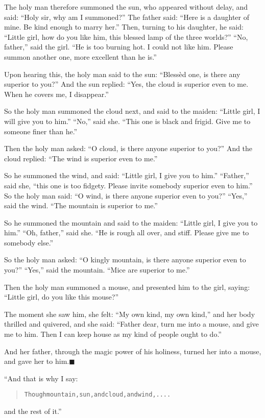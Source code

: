 \documentclass[article, twoside, 14pt]{memoir}
\newcommand{\qed}{\hfill \ensuremath{\blacksquare}}
\renewenvironment{verbatim}{%
\begin{quote}%
\vskip -10pt%
\begin{alltt}\normalfont\large}{\end{alltt}%
\end{quote}%
\vskip -10pt
} %
\begin{document}
The holy man therefore summoned the sun, who appeared without
delay, and said: ``Holy sir, why am I summoned?'' The father said:
``Here is a daughter of mine. Be kind enough to marry her.''
Then, turning to his daughter, he said:
``Little girl, how do you like him, this blessed lamp of the three worlds?''
``No, father,'' said the girl.
``He is too burning hot. I could not like him. Please summon another one, more excellent than he is.''

Upon hearing this, the holy man said to the sun:
``Blessèd one, is there any superior to you?'' And the sun replied:
``Yes, the cloud is superior even to me. When he covers me, I disappear.''

So the holy man summoned the cloud next, and said to the maiden:
``Little girl, I will give you to him.'' ``No,'' said she.
``This one is black and frigid. Give me to someone finer than he.''

Then the holy man asked:
``O cloud, is there anyone superior to you?'' And the cloud
replied: ``The wind is superior even to me.''

So he summoned the wind, and said:
``Little girl, I give you to him.'' ``Father,'' said she,
``this one is too fidgety. Please invite somebody superior even to him.''
So the holy man said:
``O wind, is there anyone superior even to you?'' ``Yes,'' said the
wind. ``The mountain is superior to me.''

So he summoned the mountain and said to the maiden:
``Little girl, I give you to him.'' ``Oh, father,'' said she.
``He is rough all over, and stiff. Please give me to somebody else.''

So the holy man asked:
``O kingly mountain, is there anyone superior even to you?''
``Yes,'' said the mountain. ``Mice are superior to me.''

Then the holy man summoned a mouse, and presented him to the girl,
saying: ``Little girl, do you like this mouse?''

The moment she saw him, she felt: ``My own kind, my own kind,'' and
her body thrilled and quivered, and she said:
``Father dear, turn me into a mouse, and give me to him. Then I can keep house as my kind of people ought to do.''

And her father, through the magic power of his holiness, turned her
into a mouse, and gave her to him.\hyperref[s60]{\qed}

“And that is why I say:

\begin{verbatim}
Though mountain, sun, and cloud, and wind, ....
\end{verbatim}
and the rest of it.”
\end{document}
